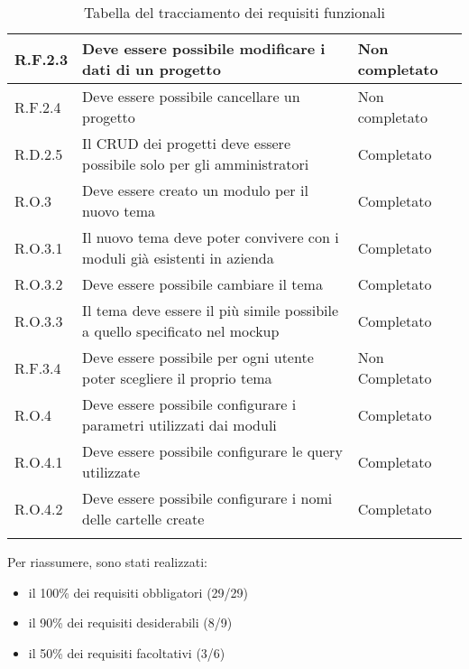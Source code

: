\begin{longtable}{p{} p{} p{}}
\hline
R.F.2.3    & Deve essere possibile modificare i dati di un progetto & Non completato \\
\hline
R.F.2.4    & Deve essere possibile cancellare un progetto & Non completato \\
\hline
R.D.2.5    & Il CRUD dei progetti deve essere possibile solo per gli amministratori & Completato \\
\hline
R.O.3  & Deve essere creato un modulo per il nuovo tema & Completato \\
\hline
R.O.3.1  & Il nuovo tema deve poter convivere con i moduli già esistenti in azienda & Completato \\
\hline
R.O.3.2  & Deve essere possibile cambiare il tema & Completato \\
\hline
R.O.3.3  & Il tema deve essere il più simile possibile a quello specificato nel mockup & Completato \\
\hline
R.F.3.4  & Deve essere possibile per ogni utente poter scegliere il proprio tema & Non Completato \\
\hline
R.O.4    & Deve essere possibile configurare i parametri utilizzati dai moduli & Completato \\
\hline
R.O.4.1    & Deve essere possibile configurare le query utilizzate & Completato \\
\hline
R.O.4.2    & Deve essere possibile configurare i nomi delle cartelle create & Completato \\
\hline
\caption{Tabella del tracciamento dei requisiti funzionali}
\label{tab:requisiti-funzionali}
\end{longtable}
\endgroup

Per riassumere, sono stati realizzati:
\begin{itemize}
\item il 100\% dei requisiti obbligatori (29/29)
\item il  90\% dei requisiti desiderabili (8/9)
\item il 	50\% dei requisiti facoltativi (3/6)
\end{itemize}